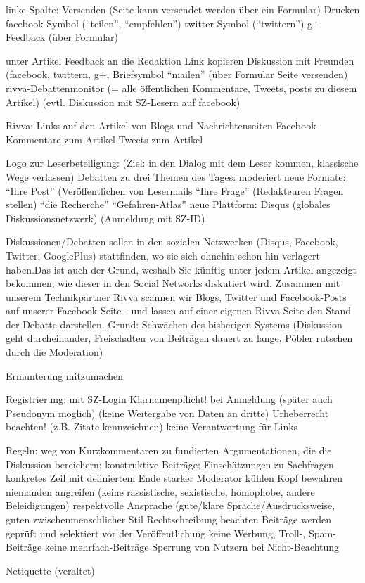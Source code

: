 linke Spalte:
	Versenden (Seite kann versendet werden über ein Formular)
	Drucken
	facebook-Symbol (``teilen'', ``empfehlen'')
	twitter-Symbol (``twittern'')
	g+
	Feedback (über Formular)
	
	
unter Artikel
	Feedback an die Redaktion 
	Link kopieren
	Diskussion mit Freunden (facebook, twittern, g+, Briefsymbol ``mailen'' (über Formular Seite versenden)
	rivva-Debattenmonitor (= alle öffentlichen Kommentare, Tweets, posts zu diesem Artikel)
	(evtl. Diskussion mit SZ-Lesern auf facebook)
	
Rivva:
	Links auf den Artikel von Blogs und Nachrichtenseiten
	Facebook-Kommentare zum Artikel 
	Tweets zum Artikel
	
Logo zur Leserbeteiligung: (Ziel: in den Dialog mit dem Leser kommen, klassische Wege verlassen)
	Debatten zu drei Themen des Tages: moderiert
	neue Formate: ``Ihre Post'' (Veröffentlichen von Lesermails
				``Ihre Frage'' (Redakteuren Fragen stellen)
				``die Recherche''
				``Gefahren-Atlas''
	neue Plattform: Disqus (globales Diskussionsnetzwerk) (Anmeldung mit SZ-ID)
	
Diskussionen/Debatten 
	sollen in den sozialen Netzwerken (Disqus, Facebook, Twitter, GooglePlus) stattfinden, wo sie sich ohnehin schon hin verlagert haben.Das ist auch der Grund, 		weshalb Sie künftig unter jedem Artikel angezeigt bekommen, wie dieser in den Social Networks diskutiert wird. Zusammen mit unserem Technikpartner Rivva 		scannen wir Blogs, Twitter und Facebook-Posts auf unserer Facebook-Seite - und lassen auf einer eigenen Rivva-Seite den Stand der Debatte darstellen.
Grund: Schwächen des bisherigen Systems (Diskussion geht durcheinander, Freischalten von Beiträgen dauert zu lange, Pöbler rutschen durch die Moderation)

Ermunterung mitzumachen 

Registrierung: mit SZ-Login
Klarnamenpflicht! bei Anmeldung (später auch Pseudonym möglich) (keine Weitergabe von Daten an dritte)
Urheberrecht beachten! (z.B. Zitate kennzeichnen)
keine Verantwortung für Links


Regeln:
	weg von Kurzkommentaren zu fundierten Argumentationen, die die Diskussion bereichern; konstruktive Beiträge; Einschätzungen zu Sachfragen
	konkretes Zeil mit definiertem Ende
	starker Moderator
	kühlen Kopf bewahren
	niemanden angreifen (keine rassistische, sexistische, homophobe, andere Beleidigungen)
	respektvolle Ansprache (gute/klare Sprache/Ausdrucksweise, guten zwischenmenschlicher Stil
	Rechtschreibung beachten
	Beiträge werden geprüft und selektiert vor der Veröffentlichung
	keine Werbung, Troll-, Spam-Beiträge
	keine mehrfach-Beiträge
	Sperrung von Nutzern bei Nicht-Beachtung
	
	
Netiquette (veraltet)
	
	